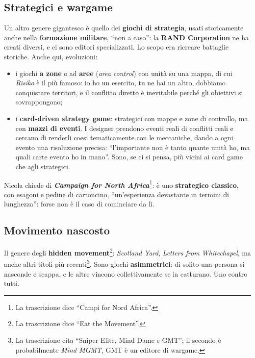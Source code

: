 \subsection{Strategici e wargame}



Un altro genere gigantesco è quello dei \textbf{giochi di strategia}, usati
storicamente anche nella \textbf{formazione militare}, ``non a caso'': la
\textbf{RAND Corporation} ne ha creati diversi, e ci sono editori specializzati.
Lo scopo era ricreare battaglie storiche. Anche qui, evoluzioni:
\begin{itemize}
  \item i giochi \textbf{a zone} o ad \textbf{aree} (\emph{area control}) con
        unità su una mappa, di cui \emph{Risiko} è il più famoso: io ho un
        esercito, tu ne hai un altro, dobbiamo conquistare territori, e il
        conflitto diretto è inevitabile perché gli obiettivi si sovrappongono;
  \item i \textbf{card-driven strategy game}: strategici con mappe e zone di
        controllo, ma con \textbf{mazzi di eventi}. I designer prendono eventi
        reali di conflitti reali e cercano di renderli coesi tematicamente con
        le meccaniche, dando a ogni evento una risoluzione precisa: ``l'importante
        non è tanto quante unità ho, ma quali carte evento ho in mano''. Sono,
        se ci si pensa, più vicini ai card game che agli strategici.
\end{itemize}
Nicola chiede di \textbf{\emph{Campaign for North Africa}}\footnote{La
trascrizione dice ``Campi for Nord Africa''.}: è uno \textbf{strategico
classico}, con esagoni e pedine di cartoncino, ``un'esperienza devastante in
termini di lunghezza'': forse non è il caso di cominciare da lì.

\subsection{Movimento nascosto}

Il genere degli \textbf{hidden movement}\footnote{La trascrizione dice ``Eat the
Movement''.}: \emph{Scotland Yard}, \emph{Letters from Whitechapel}, ma anche
altri titoli più recenti\footnote{La trascrizione cita ``Sniper Elite, Mind Dame
e GMT''; il secondo è probabilmente \emph{Mind MGMT}, GMT è un editore di
wargame.}. Sono giochi \textbf{asimmetrici}: di solito una persona si nasconde e
scappa, e le altre vincono collettivamente se la catturano. Uno contro tutti.


